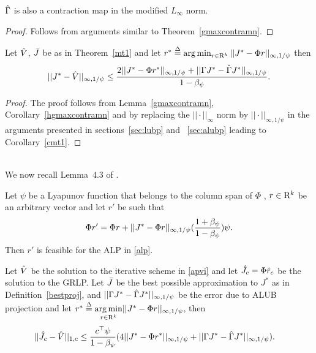 \begin{corollary}\label{hgmaxcontramn}
$\hat{\Gamma}$ is also a contraction map in the modified $L_\infty$ norm.
\end{corollary}
\begin{proof}
Follows from arguments similar to Theorem~\ref{gmaxcontramn}.
\end{proof}
\begin{lemma}\label{cmt1mn}
Let $\hat{V}$, $\bar{J}$ be as in Theorem~\ref{mt1} and let $r^*\stackrel{\Delta}{=}\arg\min_{r\in \mathrm{R}^k}||J^*-\Phi r||_{\infty,1/\psi}$ then
\begin{align}
||J^*-\hat{V}||_{\infty,1/\psi}\leq \frac{2||J^*-\Phi r^*||_{\infty,1/\psi}+||\Gamma J^*-\hat{\Gamma} J^*||_{\infty,1/\psi}}{1-\beta_{\psi}}.
\end{align}
\end{lemma}
\begin{proof}
The proof follows from Lemma~\ref{gmaxcontramn}, Corollary~\ref{hgmaxcontramn} and by replacing the $||\cdot||_\infty$ norm by $||\cdot||_{\infty,1/\psi}$ in the arguments presented in sections~\ref{sec:lubp} and ~\ref{sec:alubp} leading to Corollary~\ref{cmt1}.
\end{proof}\\
We now recall Lemma~$4.3$ of \cite{ALP}.
\begin{lemma}\label{restate}
Let $\psi$ be a Lyapunov function that belongs to the column span of $\Phi$ , $r \in \mathrm{R}^k$ be an arbitrary vector and let $r'$ be such that
\begin{align}
\Phi r'=\Phi r+||J^*-\Phi r||_{\infty,1/\psi}(\frac{1+\beta_{\psi}}{1-\beta_{\psi}})\psi.
\end{align}
Then $r'$ is feasible for the ALP in \eqref{alp}.
\end{lemma}
\begin{theorem}\label{mt2mn}
Let $\hat{V}$ be the solution to the iterative scheme in \eqref{apvi} and let $\hat{J}_c=\Phi \hat{r}_c$ be the solution to the GRLP. Let $\bar{J}$ be the best possible approximation to $J^*$ as in Definition~\ref{bestproj}, and $||\Gamma J^* -\hat{\Gamma} J^*||_{\infty,1/\psi}$ be the error due to ALUB projection and let $r^*\stackrel{\Delta}{=}\underset{r\in \mathrm{R}^k}{\arg\min}||J^*-\Phi r||_{\infty,1/\psi}$, then
\begin{align}
||\hat{J}_c-\hat{V}||_{1,c}&\leq \frac{c^\top \psi}{1-\beta_\psi}(4||J^*-\Phi r^*||_{\infty,1/\psi}
+||\Gamma J^*-\hat{\Gamma} J^*||_{\infty,1/\psi}).
\end{align}
\end{theorem}
